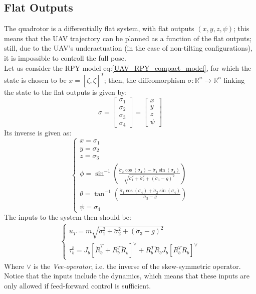 \subsection{Flat Outputs}
The quadrotor is a differentially flat system, with flat outputs $(x,y,z,\psi)$; this means that the UAV trajectory can be planned as a function of the flat outputs; still, due to the UAV's underactuation (in the case of non-tilting configurations), it is impossible to controll the full pose. \\
Let us consider the RPY model eq:\ref{UAV_RPY_compact_model}, for which the state is chosen to be $x=[\zeta,\dot{\zeta}]^{T}$; then, the diffeomorphism $\sigma:\mathbb{R}^n\rightarrow\mathbb{R}^n$ linking the state to the flat outputs is given by:
\begin{equation}\label{UAV_flat_outputs}
    \sigma=
    \begin{bmatrix}
        \sigma_1 \\ \sigma_2 \\ \sigma_3 \\ \sigma_4
    \end{bmatrix}=
    \begin{bmatrix}
        x \\ y \\ z \\ \psi
    \end{bmatrix}
\end{equation}
Its inverse is given as:
\begin{equation}\label{UAV_state_from_flat_outputs}
    \begin{cases}
        x=\sigma_1\\
        y=\sigma_2\\
        z=\sigma_3\\
        \phi=\sin^{-1}\left(\frac{\ddot{\sigma}_{2}\cos(\sigma_4)-\ddot{\sigma}_{1}\sin(\sigma_4)}{\sqrt{\ddot{\sigma}_{1}^{2}+\ddot{\sigma}_{2}^{2}+\left(\ddot{\sigma}_{3}-g\right)^{2}}}\right) \\
        \theta=\tan^{-1}\left(  \frac{\ddot{\sigma}_{1}\cos(\sigma_4)+\ddot{\sigma}_{2}\sin(\sigma_4)}{\ddot{\sigma}_3-g} \right)\\
        \psi=\sigma_4
    \end{cases}
\end{equation}
The inputs to the system then should be:
\begin{gather}\label{UAV_flat_outputs_inputs}
    \begin{cases}
        u_{T}=m\sqrt{\ddot{\sigma}_{1}^{2}+\ddot{\sigma}_{2}^{2}+\left(\ddot{\sigma}_{3}-g\right)^{2}} \\
        \tau_{b}^{b}=J_{b}\left[\dot{R}_{b}^{T}+R_{b}^{T}\ddot{R}_{b}\right]^{\vee}+R_{b}^{T}\dot{R}_{b}J_{b}\left[R_{b}^{T}\dot{R}_{b}\right]^{\vee}
    \end{cases}
\end{gather}
Where $\vee$ is the \textit{Vee-operator}, i.e. the inverse of the skew-symmetric operator. Notice that the inputs include the dynamics, which means that these inputs are only allowed if feed-forward control is sufficient.
